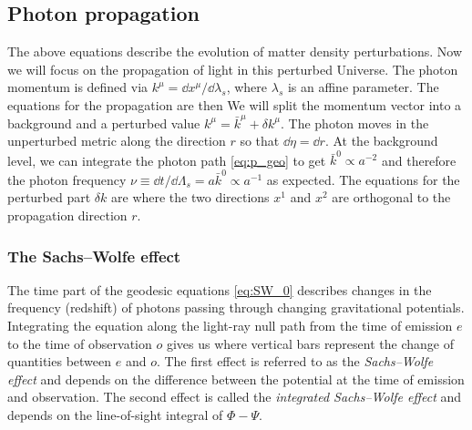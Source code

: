 \subsection{Photon propagation}
The above equations describe the evolution of matter density perturbations. Now we will focus on the propagation of light in this perturbed Universe. The photon momentum is defined via $k^\mu=\dd x^\mu/\dd\lambda_s$, where $\lambda_s$ is an affine parameter. The equations for the propagation are then
We will split the momentum vector into a background and a perturbed value $k^\mu=\bar k^\mu+\delta k^\mu$. The photon moves in the unperturbed metric along the direction $r$ so that $\dd\eta=\dd r$. At the background level, we can integrate the photon path \eqref{eq:p_geo} to get $\bar k^0\propto a^{-2}$ and therefore the photon frequency $\nu\equiv\dd t/\dd\Lambda_s=a\bar k^0\propto a^{-1}$ as expected. The equations for the perturbed part $\delta k$ are \parencite[for details see e.g. ][]{2010deto.book.....A}
where the two directions $x^1$ and $x^2$ are orthogonal to the propagation direction $r$.
\subsubsection{The Sachs--Wolfe effect}
The time part of the geodesic equations \eqref{eq:SW_0} describes changes in the frequency (redshift) of photons passing through changing gravitational potentials. Integrating the equation along the light-ray null path from the time of emission $e$ to the time of observation $o$ gives us
where vertical bars represent the change of quantities between $e$ and $o$. The first effect is referred to as the \textit{Sachs--Wolfe effect} and depends on the difference between the potential at the time of emission and observation. The second effect is called the \textit{integrated Sachs--Wolfe effect} and depends on the line-of-sight integral of $\Phi-\Psi$.
